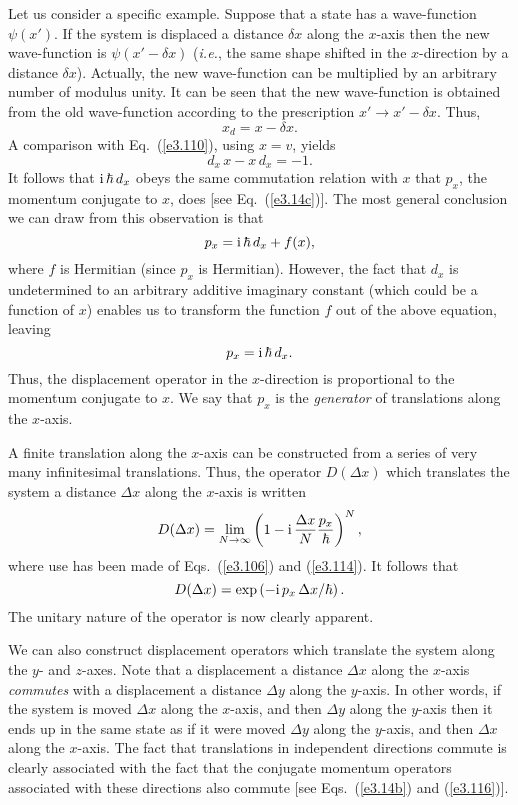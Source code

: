 Let us consider a specific example. 
Suppose that a state has a wave-function $\psi(x')$. If the system is displaced
a distance $\delta x$ along the $x$-axis then the new wave-function is
$\psi(x'-\delta x)$ ({\em i.e.}, the same shape shifted in the $x$-direction
by a distance $\delta x$). Actually, the new wave-function can be multiplied by
an arbitrary number of modulus unity. It can be seen that the new wave-function  
is obtained from the old wave-function according to the 
prescription  $x'\rightarrow x'- \delta x$. Thus,
\begin{equation}
x_d = x -\delta x.
\end{equation}
A comparison  with Eq.~(\ref{e3.110}), using  $x=v$, yields
\begin{equation}
d_x \,x - x\,d_x = -1.
\end{equation}
It follows that ${\rm i}\,\hbar\, d_x$ obeys the same commutation relation with 
$x$ that $p_x$, the momentum conjugate to $x$, does [see Eq.~(\ref{e3.14c})]. 
The most general conclusion we can draw from this observation is that
\begin{equation}
p_x = {\rm i}\,\hbar\, d_x + f(x),
\end{equation}
where $f$ is Hermitian (since $p_x$ is Hermitian). However, the fact that $d_x$
is undetermined to an arbitrary additive imaginary constant (which could be a function
of $x$) enables us to transform the function $f$ out of the above equation, leaving
\begin{equation}\label{e3.114}
p_x = {\rm i}\,\hbar\, d_x.
\end{equation}
Thus, the displacement operator in the $x$-direction is proportional to the
momentum conjugate to $x$. We say that $p_x$ is the {\em generator} of translations
along the $x$-axis. 

A finite translation along the $x$-axis can be constructed from 
a series of very many
infinitesimal translations. Thus, the operator $D(\Delta x)$ which translates the
system a distance $\Delta x$ along the $x$-axis is
written
\begin{equation}
D(\Delta x) =
\lim_{N\rightarrow \infty}
 \left(1-{\rm i}\, \frac{\Delta x}{N} \frac{p_x}{\hbar}\right)^N,
\end{equation}
where use has been made of Eqs.~(\ref{e3.106}) and (\ref{e3.114}). It follows that
\begin{equation}\label{e3.116}
D(\Delta x) = \exp\left({-\rm i} \,p_x\,\Delta x /\hbar\right).
\end{equation}
The unitary nature of the operator is now clearly apparent.

We can also construct displacement operators which translate the system along
the $y$- and $z$-axes. Note that a displacement a distance $\Delta x$ 
along the
$x$-axis {\em commutes} with a displacement a distance $\Delta y$ along the
 $y$-axis. 
In other words, if the system is moved $\Delta x$ along the $x$-axis, and then
$\Delta y$ along the $y$-axis then it ends up in the same state as if it were moved
$\Delta y$ along the $y$-axis, and then $\Delta x$ along the $x$-axis. The fact that
translations in independent directions commute is clearly associated with the
fact that the conjugate momentum operators
 associated with these directions also commute
[see Eqs.~(\ref{e3.14b}) and (\ref{e3.116})].
 